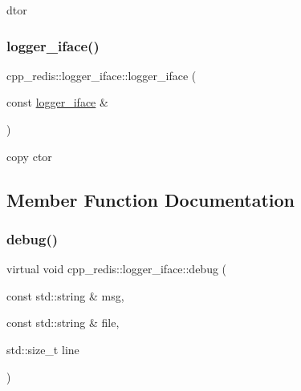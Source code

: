 dtor 

\mbox{\label{classcpp__redis_1_1logger__iface_a7f1cb271b18e40f2dde7e45028e69a84}} 
\subsubsection{\texorpdfstring{logger\+\_\+iface()}{logger\_iface()}\hspace{0.1cm}{\footnotesize\ttfamily [2/2]}}
{\footnotesize\ttfamily cpp\+\_\+redis\+::logger\+\_\+iface\+::logger\+\_\+iface (\begin{DoxyParamCaption}\item[{const \hyperlink{classcpp__redis_1_1logger__iface}{logger\+\_\+iface} \&}]{ }\end{DoxyParamCaption})\hspace{0.3cm}{\ttfamily [default]}}



copy ctor 



\subsection{Member Function Documentation}
\mbox{\label{classcpp__redis_1_1logger__iface_aaace9e12cbb32d7bdd76c17180a30de7}} 
\subsubsection{\texorpdfstring{debug()}{debug()}}
{\footnotesize\ttfamily virtual void cpp\+\_\+redis\+::logger\+\_\+iface\+::debug (\begin{DoxyParamCaption}\item[{const std\+::string \&}]{msg,  }\item[{const std\+::string \&}]{file,  }\item[{std\+::size\+\_\+t}]{line }\end{DoxyParamCaption})\hspace{0.3cm}{\ttfamily [pure virtual]}}


